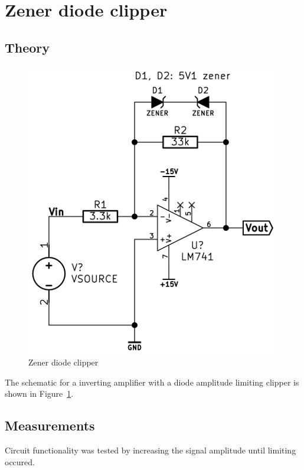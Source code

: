 \documentclass[11pt,a4paper]{article}
\begin{document}
\section{Zener diode clipper}\label{zener-clipper}

\subsection{Theory}\label{clipper-theory}
\begin{figure}[htbp]
    \centering
        \includegraphics[scale=0.5]{img/zenerclipper.png}
    \caption{Zener diode clipper}
    \label{fig:clipper-schem}
\end{figure}

The schematic for a inverting amplifier with a diode amplitude limiting clipper
is shown in Figure~\ref{fig:clipper-schem}.

\subsection{Measurements}\label{clipper-measurements}
Circuit functionality was tested by increasing the signal amplitude until
limiting occured.
\end{document}
